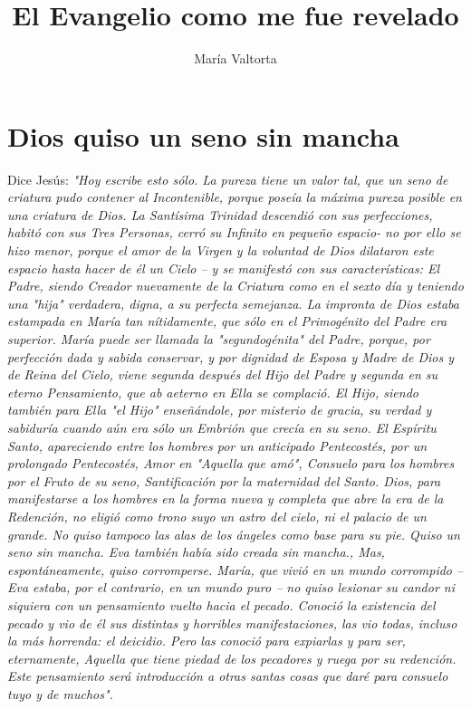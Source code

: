 \documentclass[12pt]{book} %
\title{El Evangelio como me fue revelado}
\author{María Valtorta}
\begin{document}
\maketitle
\chapter{Dios quiso un seno sin mancha}

Dice Jesús: 
\emph{"Hoy escribe esto sólo. La pureza tiene un valor tal, que un seno de criatura pudo contener al Incontenible, porque poseía la máxima pureza posible en una criatura de Dios. La Santísima Trinidad descendió con sus perfecciones, habitó con sus Tres Personas, cerró su Infinito en pequeño espacio- no por ello se hizo menor, porque el amor de la Virgen y la voluntad de Dios dilataron este espacio hasta hacer de él un Cielo – y se manifestó con sus características: El Padre, siendo Creador nuevamente de la Criatura como en el sexto día y teniendo una "hija" verdadera, digna, a su perfecta semejanza. La impronta de Dios estaba estampada en María tan nítidamente, que sólo en el Primogénito del Padre era superior. María puede ser llamada la "segundogénita" del Padre, porque, por perfección dada y sabida conservar, y por dignidad de Esposa y Madre de Dios y de Reina del Cielo, viene segunda después del Hijo del Padre y segunda en su eterno Pensamiento, que ab aeterno en Ella se complació. El Hijo, siendo también para Ella "el Hijo" enseñándole, por misterio de gracia, su verdad y sabiduría cuando aún era sólo un Embrión que crecía en su seno. El Espíritu Santo, apareciendo entre los hombres por un anticipado Pentecostés, por un prolongado Pentecostés, Amor en "Aquella que amó", Consuelo para los hombres por el Fruto de su seno, Santificación por la maternidad del Santo. Dios, para manifestarse a los hombres en la forma nueva y completa que abre la era de la Redención, no eligió como trono suyo un astro del cielo, ni el palacio de un grande. No quiso tampoco las alas de los ángeles como base para su pie. Quiso un seno sin mancha. Eva también había sido creada sin mancha., Mas, espontáneamente, quiso corromperse. María, que vivió en un mundo corrompido – Eva estaba, por el contrario, en un mundo puro – no quiso lesionar su candor ni siquiera con un pensamiento vuelto hacia el pecado. Conoció la existencia del pecado y vio de él sus distintas y horribles manifestaciones, las vio todas, incluso la más horrenda: el deicidio. Pero las conoció para expiarlas y para ser, eternamente, Aquella que tiene piedad de los pecadores y ruega por su redención. Este pensamiento será introducción a otras santas cosas que daré para consuelo tuyo y de muchos".}
 
\end{document}
